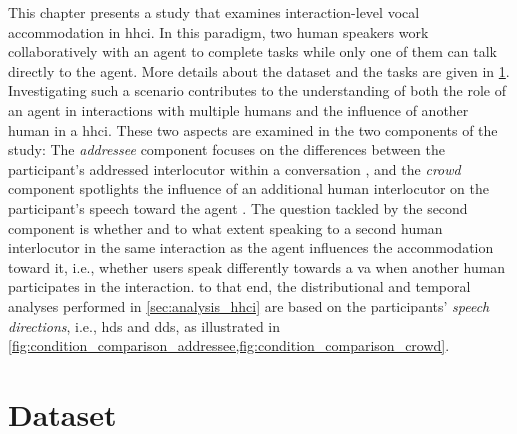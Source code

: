 This chapter presents a study that examines interaction-level vocal accommodation in \ac{hhci}.
In this paradigm, two human speakers work collaboratively with an agent to complete tasks while only one of them can talk directly to the agent.
More details about the dataset and the tasks are given in \cref{sec:vacc}.
Investigating such a scenario contributes to the understanding of both the role of an agent in interactions with multiple humans and the influence of another human in a \ac{hhci}.
These two aspects are examined in the two components of the study:
The \emph{addressee} component focuses on the differences between the participant's addressed interlocutor within a conversation \citep[see][]{Raveh2019ESSV}, and the \emph{crowd} component spotlights the influence of an additional human interlocutor on the participant's speech toward the agent \citep[see][]{Raveh2019InterspeechAlexa}.
The question tackled by the second component is whether and to what extent speaking to a second human interlocutor in the same interaction as the agent influences the accommodation toward it, i.e., whether users speak differently towards a \ac{va} when another human participates in the interaction.
to that end, the distributional and temporal analyses performed in \cref{sec:analysis_hhci} are based on the participants' \emph{speech directions}, i.e., \acf{hds} and \acf{dds}, as illustrated in \cref{fig:condition_comparison_addressee,fig:condition_comparison_crowd}.

\section[The \acl{vacc}]{Dataset}
\label{sec:vacc}

